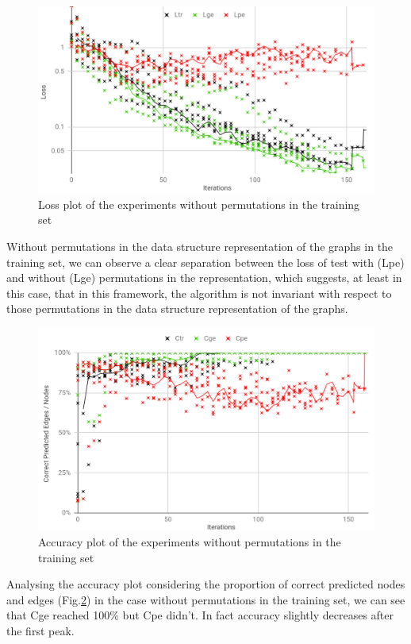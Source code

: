 \begin{figure}[H]
    \centering
    \includegraphics[width=.9\linewidth]
    {fig/content/results/shapes/base/loss.png}
    \caption{Loss plot of the experiments without permutations in the training set}
    \label{fig:regions_separation_base_loss}
\end{figure}

Without permutations in the data structure representation of the graphs in the training set, we can observe a clear separation between the loss of test with (Lpe) and without (Lge) permutations in the representation, which suggests, at least in this case, that in this framework, the algorithm is not invariant with respect to those permutations in the data structure representation of the graphs.

\begin{figure}[H]
    \centering
    \includegraphics[width=.9\linewidth]
    {fig/content/results/shapes/base/correct.png}
    \caption{Accuracy plot of the experiments without permutations in the training set}
    \label{fig:regions_separation_base_accuracy}
\end{figure}

Analysing the accuracy plot considering the proportion of correct predicted nodes and edges (Fig.\ref{fig:regions_separation_base_accuracy}) in the case without permutations in the training set, we can see that Cge reached 100\% but Cpe didn't. In fact accuracy slightly decreases after the first peak.

